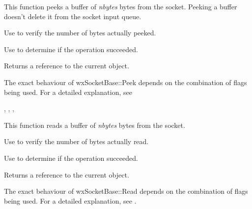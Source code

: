 This function peeks a buffer of {\it nbytes} bytes from the socket.
Peeking a buffer doesn't delete it from the socket input queue.

Use  to verify the number of bytes actually peeked.

Use  to determine if the operation succeeded.





Returns a reference to the current object.


The exact behaviour of wxSocketBase::Peek depends on the combination
of flags being used. For a detailed explanation, see 


, 
, 
, 

%
%
\label{wxsocketbaseread}


This function reads a buffer of {\it nbytes} bytes from the socket.

Use  to verify the number of bytes actually read.

Use  to determine if the operation succeeded.





Returns a reference to the current object.


The exact behaviour of wxSocketBase::Read depends on the combination
of flags being used. For a detailed explanation, see .

